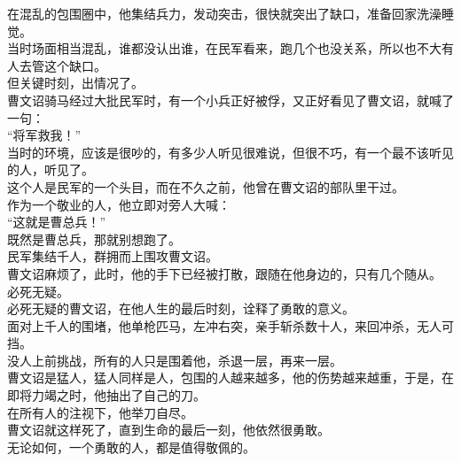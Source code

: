 \begin{multicols}{\theparacolNo}
在混乱的包围圈中，他集结兵力，发动突击，很快就突出了缺口，准备回家洗澡睡觉。\\

当时场面相当混乱，谁都没认出谁，在民军看来，跑几个也没关系，所以也不大有人去管这个缺口。\\

但关键时刻，出情况了。\\

曹文诏骑马经过大批民军时，有一个小兵正好被俘，又正好看见了曹文诏，就喊了一句：\\

“将军救我！”\\

当时的环境，应该是很吵的，有多少人听见很难说，但很不巧，有一个最不该听见的人，听见了。\\

这个人是民军的一个头目，而在不久之前，他曾在曹文诏的部队里干过。\\

作为一个敬业的人，他立即对旁人大喊：\\

“这就是曹总兵！”\\

既然是曹总兵，那就别想跑了。\\

民军集结千人，群拥而上围攻曹文诏。\\

曹文诏麻烦了，此时，他的手下已经被打散，跟随在他身边的，只有几个随从。\\

必死无疑。\\

必死无疑的曹文诏，在他人生的最后时刻，诠释了勇敢的意义。\\

面对上千人的围堵，他单枪匹马，左冲右突，亲手斩杀数十人，来回冲杀，无人可挡。\\

没人上前挑战，所有的人只是围着他，杀退一层，再来一层。\\

曹文诏是猛人，猛人同样是人，包围的人越来越多，他的伤势越来越重，于是，在即将力竭之时，他抽出了自己的刀。\\

在所有人的注视下，他举刀自尽。\\

曹文诏就这样死了，直到生命的最后一刻，他依然很勇敢。\\

无论如何，一个勇敢的人，都是值得敬佩的。\\


\end{multicols}
